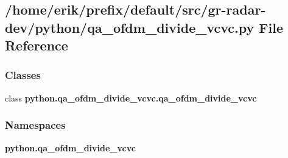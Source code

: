 \subsection{/home/erik/prefix/default/src/gr-\/radar-\/dev/python/qa\+\_\+ofdm\+\_\+divide\+\_\+vcvc.py File Reference}
\label{qa__ofdm__divide__vcvc_8py}
\subsubsection*{Classes}
\begin{DoxyCompactItemize}
\item 
class {\bf python.\+qa\+\_\+ofdm\+\_\+divide\+\_\+vcvc.\+qa\+\_\+ofdm\+\_\+divide\+\_\+vcvc}
\end{DoxyCompactItemize}
\subsubsection*{Namespaces}
\begin{DoxyCompactItemize}
\item 
 {\bf python.\+qa\+\_\+ofdm\+\_\+divide\+\_\+vcvc}
\end{DoxyCompactItemize}
